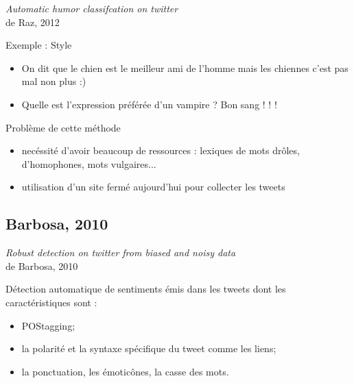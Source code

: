 \documentclass{beamer}
\begin{document}
\begin{frame}[allowframebreaks]{\textit{Automatic humor classifcation on twitter}\\ de Raz, 2012 \cite{Raz12}}
\begin{exampleblock}{Exemple : Style}
\begin{itemize}
\item On dit que le chien est le meilleur ami de l’homme mais les chiennes c’est pas mal non plus :)
\item Quelle est l’expression préférée d’un vampire ? Bon sang ! ! !
\end{itemize}
\end{exampleblock}


\begin{block}{Problème de cette méthode}
\begin{itemize}
\item necéssité d'avoir beaucoup de ressources : lexiques de mots drôles, d'homophones, mots vulgaires...
\item utilisation d'un site fermé aujourd'hui pour collecter les tweets 
\end{itemize}
\end{block}

\end{frame}


\subsection{Barbosa, 2010}
\begin{frame}[allowframebreaks]{\textit{Robust detection on twitter from biased and noisy data}\\ de Barbosa, 2010 \cite{Barbosa2010}}


Détection automatique de sentiments émis dans les tweets dont les caractéristiques sont :
\begin{itemize}
\item POStagging;
\item la polarité et la syntaxe spécifique du tweet comme les liens;
\item la ponctuation, les émoticônes, la casse des mots.
\end{itemize}
\end{frame}
\end{document}
